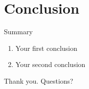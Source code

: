 \documentclass[aspectratio=169]{beamer}
\begin{document}
\section{Conclusion}
\begin{frame}{Summary}
  \begin{enumerate}
    \item Your first conclusion
    \item Your second conclusion
  \end{enumerate}
  \vfill
  \begin{center}
    {\Large Thank you. Questions?}
  \end{center}
\end{frame}
\end{document}
